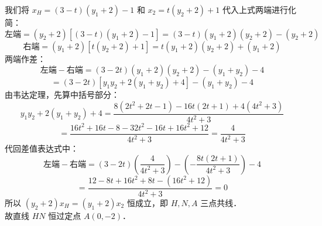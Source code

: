 {\begin{proof*}
\[\]
我们将 $x_H = (3-t)(y_1+2) - 1$ 和 $x_2 = t(y_2+2) + 1$ 代入上式两端进行化简：
\[
\text{左端} = (y_2+2)[(3-t)(y_1+2) - 1] = (3-t)(y_1+2)(y_2+2) - (y_2+2)
\]
\[
\text{右端} = (y_1+2)[t(y_2+2) + 1] = t(y_1+2)(y_2+2) + (y_1+2)
\]
两端作差：
\[
\text{左端} - \text{右端} = (3-2t)(y_1+2)(y_2+2) - (y_1+y_2) - 4
\]
\[
= (3-2t)[y_1y_2 + 2(y_1+y_2) + 4] - (y_1+y_2) - 4
\]
由韦达定理，先算中括号部分：
\[
y_1y_2 + 2(y_1+y_2) + 4 = \frac{8(2t^2+2t-1) - 16t(2t+1) + 4(4t^2+3)}{4t^2+3}
\]
\[
= \frac{16t^2+16t-8 - 32t^2-16t + 16t^2+12}{4t^2+3} = \frac{4}{4t^2+3}
\]
代回差值表达式中：
\[
\text{左端} - \text{右端} = (3-2t)\left(\frac{4}{4t^2+3}\right) - \left(-\frac{8t(2t+1)}{4t^2+3}\right) - 4
\]
\[
= \frac{12-8t + 16t^2+8t - (16t^2+12)}{4t^2+3} = 0
\]
所以 $(y_2+2)x_H = (y_1+2)x_2$ 恒成立，即 $H, N, A$ 三点共线．\\
故直线 $HN$ 恒过定点 $A(0, -2)$．
\end{proof*}
}
\newcommand{\qConicHardNationalBDiagnosis}{
\errortag{定点猜测失误} 本题的难点之一在于“直线过定点”的定点需要由学生自行寻找。若采用特殊位置（如 $t=0$ 直线垂直 $x$ 轴）代入，可求得此时直线为 $y+2 = -\frac{y_1}{3y_1+4}x$，代入 $x=0$ 即可得 $y=-2$，锁定定点为 $A(0,-2)$．许多学生在没有特殊化定点时直接联立，极易在中途因为变量过多而放弃．\\
\errortag{代数化简繁琐} 在作差证明 $(3-2t)(y_1+2)(y_2+2) - (y_1+y_2) - 4 = 0$ 时，必须掌握“先整体计算其中一部分”的模块化化简意识（如本解析中先算 $y_1y_2+2(y_1+y_2)+4$）。若直接把韦达公式代入并通分，会导致代数项数过多，在限时紧张的情况下容易发生计算错误。
}
